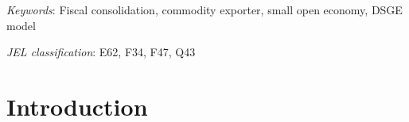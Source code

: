\documentclass[12pt]{article}
\begin{document}
\begin{abstract}

\end{abstract}

\textit{Keywords}: Fiscal consolidation, commodity exporter, small open economy, DSGE model


\textit{JEL classification}: E62, F34, F47, Q43


\thispagestyle{empty}
\setcounter{page}{0}
\clearpage
\setcounter{page}{1}


\section{Introduction}
\end{document}
